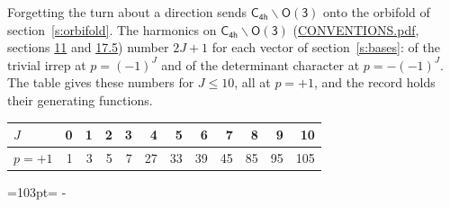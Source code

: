\documentclass[10pt,a4paper]{article}
\newcommand{\needspace}[1]{\par\penalty-100\begingroup\dimen0=#1\relax\dimen2=\pagegoal
  \advance\dimen2-\pagetotal\ifdim\dimen0>\dimen2\relax\ifdim\dimen2>0pt\vfil\break\fi\fi
  \endgroup}
\numberwithin{equation}{section}
\newcommand{\grp}[1]{\mathsf{#1}}
\begin{document}
Forgetting the turn about a direction sends $\grp{C_{4h}}\backslash\grp{O(3)}$ onto the orbifold of section~\ref{s:orbifold}.
The harmonics on $\grp{C_{4h}}\backslash\grp{O(3)}$ (\href{../../CONVENTIONS.pdf}{CONVENTIONS.pdf}, sections \href{../../CONVENTIONS.pdf\#conv.11}{11} and \href{../../CONVENTIONS.pdf\#conv.17.5}{17.5}) number $2J + 1$ for each vector of section~\ref{s:bases}: of the trivial irrep at $p = (-1)^J$ and of the determinant character at $p = -(-1)^J$. The table gives these numbers for $J \le 10$, all at $p = +1$, and the record holds their generating functions.
{\small\setlength{\tabcolsep}{4pt}\begin{longtable}{@{}lrrrrrrrrrrr@{}}\toprule
$J$ & 0 & 1 & 2 & 3 & 4 & 5 & 6 & 7 & 8 & 9 & 10\\\midrule\endhead
\bottomrule\endfoot\endlastfoot
$p = +1$ & 1 & 3 & 5 & 7 & 27 & 33 & 39 & 45 & 85 & 95 & 105\\
\bottomrule\end{longtable}}
\needspace{103pt}
\end{document}
